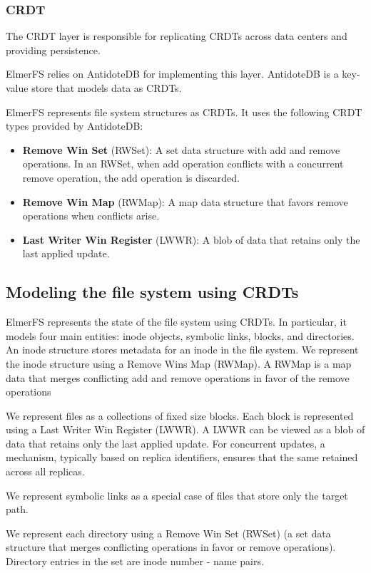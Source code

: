 \documentclass[sigconf, anonymous, 10pt]{acmart}
\begin{document}
\subsubsection{CRDT}

The CRDT layer is responsible for replicating CRDTs across data centers
and providing persistence.

ElmerFS relies on AntidoteDB for implementing this layer.
AntidoteDB is a key-value store that models data as CRDTs.

ElmerFS represents file system structures as CRDTs.
It uses the following CRDT types provided by AntidoteDB:
\begin{itemize}
	\item \textbf{Remove Win Set} (RWSet): A set data structure with add and
		  remove operations.
      In an RWSet, when add operation conflicts with a concurrent remove
		  operation, the add operation is discarded.
	\item \textbf{Remove Win Map} (RWMap): A map data structure that
		  favors remove operations when conflicts arise.
	\item \textbf{Last Writer Win Register} (LWWR): A blob of data that
	retains only the last applied update.
\end{itemize}

\subsection{Modeling the file system using CRDTs}

ElmerFS represents the state of the file system using CRDTs.
In particular, it models four main entities: inode objects,
symbolic links, blocks, and directories.
An inode structure stores metadata for an inode in the file system.
We represent the inode structure using a Remove Wins Map (RWMap).
A RWMap is a map data that merges conflicting add and remove operations
in favor of the remove operations

We represent files as a collections of fixed size blocks.
Each block is represented using a Last Writer Win Register (LWWR).
A LWWR can be viewed as a blob of data that retains only the last applied update.
For concurrent updates, a mechanism, typically based on replica identifiers,
ensures that the same retained across all replicas.

We represent symbolic links as a special case of files that store only
the target path.

We represent each directory using a Remove Win Set (RWSet) (a set data structure
that merges conflicting operations in favor or remove operations).
Directory entries in the set are inode number - name pairs.
\end{document}
